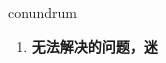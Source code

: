 
\begin{frame}
{\huge conundrum}
\begin{center}
\begin{enumerate}\Large
  \item \textbf{无法解决的问题，迷}
\end{enumerate}
\end{center}
\end{frame}
